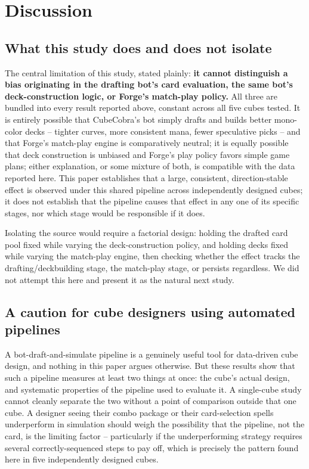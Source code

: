\documentclass[11pt]{article}
\begin{document}
\section{Discussion}

\subsection{What this study does and does not isolate}

The central limitation of this study, stated plainly: \textbf{it cannot
distinguish a bias originating in the drafting bot's card evaluation, the same
bot's deck-construction logic, or Forge's match-play policy.} All three are
bundled into every result reported above, constant across all five cubes tested.
It is entirely possible that CubeCobra's bot simply drafts and builds better
mono-color decks -- tighter curves, more consistent mana, fewer speculative
picks -- and that Forge's match-play engine is comparatively neutral; it is
equally possible that deck construction is unbiased and Forge's play policy
favors simple game plans; either explanation, or some mixture of both, is
compatible with the data reported here. This
paper establishes that a large, consistent, direction-stable effect is observed
under this shared pipeline across independently designed cubes; it does not
establish that the pipeline causes that effect in any one of its specific
stages, nor which stage would be responsible if it does.

Isolating the source would require a factorial design: holding the drafted card
pool fixed while varying the deck-construction policy, and holding decks fixed
while varying the match-play engine, then checking whether the effect tracks the
drafting/deckbuilding stage, the match-play stage, or persists regardless. We
did not attempt this here and present it as the natural next study.

\subsection{A caution for cube designers using automated pipelines}

A bot-draft-and-simulate pipeline is a genuinely useful tool for data-driven cube
design, and nothing in this paper argues otherwise. But these results show that
such a pipeline measures at least two things at once: the cube's actual design,
and systematic properties of the pipeline used to evaluate it. A single-cube
study cannot cleanly separate the two without a point of comparison outside that
one cube. A designer seeing their combo package or their card-selection spells
underperform in simulation should weigh the possibility that the pipeline, not
the card, is the limiting factor -- particularly if the underperforming strategy
requires several correctly-sequenced steps to pay off, which is precisely the
pattern found here in five independently designed cubes.
\end{document}
